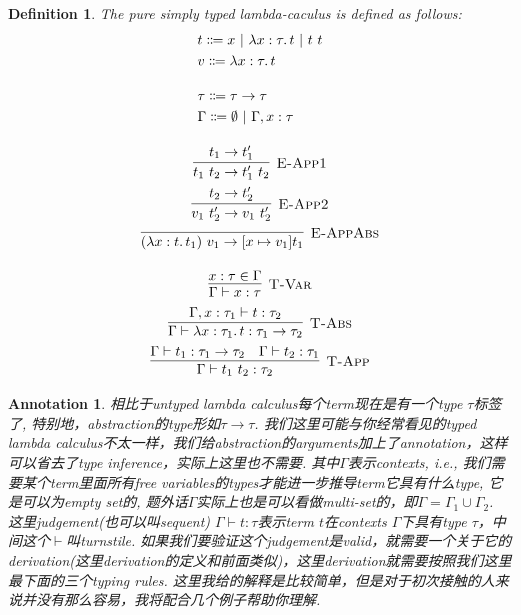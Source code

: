 \documentclass{article}
\newtheorem{definition}[theorem]{Definition}
\newtheorem{annotation}[theorem]{Annotation}
\newcommand{\lam}[2]{\ensuremath{\lambda #1\ldotp #2}} %
\newcommand{\termtype}[2]{\ensuremath{#1:#2}}
\begin{document}
\begin{definition}
\rm The pure simply typed lambda-caculus is defined as follows:
\[
	\begin{gathered}
	\begin{aligned}
	&t \Coloneqq x ~|~ \lam{\termtype{x}{\tau}}{t} ~|~ t~t \\
	&v \Coloneqq \lam{\termtype{x}{\tau}}{t} \\[1em]
	&\tau \Coloneqq \tau \to \tau \\
	&\Gamma \Coloneqq \emptyset ~|~ \Gamma, \termtype{x}{\tau}
	\end{aligned} \\[1em]
	\infer[\textsc{E-App1}]{t_1~t_2 \to t_1'~t_2}{t_1 \to t_1'} \\
	\infer[\textsc{E-App2}]{v_1~t_2' \to v_1~t_2'}{t_2 \to t_2'} \\
	\infer[\textsc{E-AppAbs}]{(\lam{\termtype{x}{t}}{t_1})~v_1 \to [x \mapsto v_1] t_1}{} \\[1em]
	\infer[\textsc{T-Var}]{\Gamma \vdash \termtype{x}{\tau}}{\termtype{x}{\tau} \in \Gamma} \\
	\infer[\textsc{T-Abs}]{\Gamma \vdash \termtype{\lam{\termtype{x}{\tau_1}}{t}}{\tau_1 \to \tau_2}}{\Gamma, \termtype{x}{\tau_1} \vdash \termtype{t}{\tau_2}} \\
	\infer[\textsc{T-App}]{\Gamma \vdash \termtype{t_1~t_2}{\tau_2}}{\Gamma \vdash \termtype{t_1}{\tau_1 \to \tau_2} & \Gamma \vdash \termtype{t_2}{\tau_1}}
	\end{gathered}
\]
\end{definition}

\begin{annotation}
\rm 相比于untyped lambda calculus每个term现在是有一个type $\tau$标签了, 特别地，abstraction的type形如$\tau \to \tau$. 我们这里可能与你经常看见的typed lambda calculus不太一样，我们给abstraction的arguments加上了annotation，这样可以省去了type inference，实际上这里也不需要. 其中$\Gamma$表示contexts, i.e., 我们需要某个term里面所有free variables的types才能进一步推导term它具有什么type, 它是可以为empty set的, 题外话$\Gamma$实际上也是可以看做multi-set的，即$\Gamma = \Gamma_1\cup \Gamma_2$. 这里judgement(也可以叫sequent) $\Gamma \vdash t:\tau$表示term $t$在contexts $\Gamma$下具有type $\tau$，中间这个$\vdash$叫turnstile. 如果我们要验证这个judgement是valid，就需要一个关于它的derivation(这里derivation的定义和前面类似)，这里derivation就需要按照我们这里最下面的三个typing rules. 这里我给的解释是比较简单，但是对于初次接触的人来说并没有那么容易，我将配合几个例子帮助你理解. 
\end{annotation}
\end{document}
